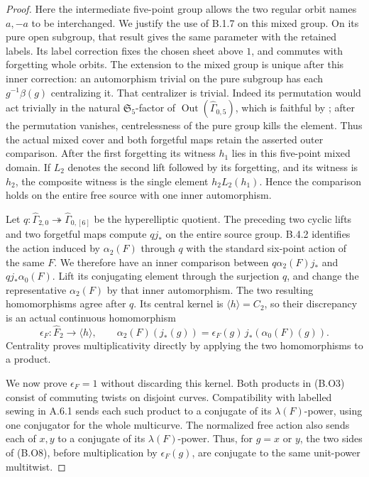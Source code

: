\begin{proof}
Here the intermediate five-point group allows the
two regular orbit names \(a,-a\) to be interchanged.
We justify the use of B.1.7 on this mixed group.
On its pure open subgroup, that result gives the
same parameter with the retained labels. Its label
correction fixes the chosen sheet above \(1\), and
commutes with forgetting whole orbits. The extension
to the mixed group is unique after this inner
correction: an automorphism trivial on the pure
subgroup has each \(g^{-1}\beta(g)\) centralizing it.
That centralizer is trivial. Indeed its permutation
would act trivially in the natural
\(\mathfrak S_5\)-factor of
\(\operatorname{Out}(\widehat\Gamma_{0,5})\), which
is faithful by \cite[Corollary 2.8]{CA_HMM}; after
the permutation vanishes, centrelessness of the pure
group kills the element. Thus the actual mixed
cover and both forgetful maps retain the asserted
outer comparison.
After the first forgetting its witness \(h_1\)
lies in this five-point mixed domain. If \(L_2\)
denotes the second lift followed by its forgetting,
and its witness is \(h_2\), the composite witness
is the single element \(h_2L_2(h_1)\). Hence the
comparison holds on the entire free source with
one inner automorphism.

Let
\(q:\widehat\Gamma_{2,0}\twoheadrightarrow
\widehat\Gamma_{0,[6]}\) be the hyperelliptic quotient.
The preceding two cyclic lifts and two forgetful maps
compute \(qj_*\) on the entire source group. B.4.2
identifies the action induced by \(\alpha_2(F)\)
through \(q\) with the standard six-point action of
the same \(F\). We therefore have an inner comparison
between \(q\alpha_2(F)j_*\) and
\(qj_*\alpha_0(F)\). Lift its conjugating element
through the surjection \(q\), and change the
representative \(\alpha_2(F)\) by that inner
automorphism. The two resulting homomorphisms agree
after \(q\). Its central kernel is
\(\langle h\rangle=C_2\), so their discrepancy is
an actual continuous homomorphism
\[
 \epsilon_F:\widehat F_2\longrightarrow\langle h\rangle,
 \qquad
 \alpha_2(F)(j_*(g))=
 \epsilon_F(g)\,j_*(\alpha_0(F)(g)).                    \tag{B.O8}
\]
Centrality proves multiplicativity directly by applying
the two homomorphisms to a product.

We now prove \(\epsilon_F=1\) without discarding this
kernel. Both products in (B.O3) consist of commuting
twists on disjoint curves. Compatibility with labelled
sewing in A.6.1 sends each such product to a conjugate
of its \(\lambda(F)\)-power, using one conjugator
for the whole multicurve. The normalized free action
also sends each of \(x,y\) to a conjugate of its
\(\lambda(F)\)-power. Thus, for \(g=x\) or \(y\),
the two sides of (B.O8), before multiplication by
\(\epsilon_F(g)\), are conjugate to the same
unit-power multitwist.


\end{proof}
